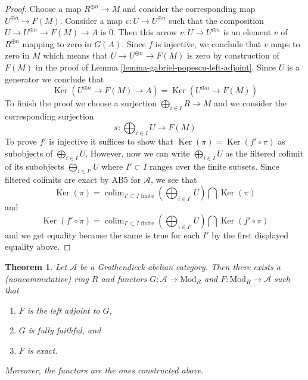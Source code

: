 \documentclass{stacks-project}
\theoremstyle{plain}
\newtheorem{theorem}[subsection]{Theorem}
\theoremstyle{definition}
\theoremstyle{remark}
\numberwithin{equation}{subsection}
\def\colim{\mathop{\mathrm{colim}}\nolimits}
\def\Ker{\mathop{\mathrm{Ker}}}
\begin{document}
\begin{proof}
Choose a map $R^{\oplus n} \to M$ and consider the corresponding map
$U^{\oplus n} \to F(M)$. Consider a map $v : U \to U^{\oplus n}$
such that the composition $U \to U^{\oplus n} \to F(M) \to A$ is $0$.
Then this arrow $v : U \to U^{\oplus n}$ is an element
$v$ of $R^{\oplus n}$ mapping to zero in $G(A)$. Since $f$ is injective,
we conclude that $v$ maps to zero in $M$ which means that
$U \to U^{\oplus n} \to F(M)$ is zero by construction of $F(M)$
in the proof of Lemma \ref{lemma-gabriel-popescu-left-adjoint}.
Since $U$ is a generator we conclude that
$$
\Ker(U^{\oplus n} \to F(M) \to A) = \Ker(U^{\oplus n} \to F(M))
$$
To finish the proof we choose a surjection $\bigoplus_{i \in I} R \to M$
and we consider the corresponding surjection
$$
\pi : \bigoplus\nolimits_{i \in I} U \longrightarrow F(M)
$$
To prove $f'$ is injective it suffices to show that
$\Ker(\pi) = \Ker(f' \circ \pi)$ as subobjects of $\bigoplus_{i \in I} U$.
However, now we can write $\bigoplus_{i \in I} U$ as the filtered colimit
of its subobjects $\bigoplus_{i \in I'} U$ where $I' \subset I$
ranges over the finite subsets. Since filtered colimits are
exact by AB5 for $\mathcal{A}$, we see that
$$
\Ker(\pi) =
\colim_{I' \subset I\text{ finite}}
\left(\bigoplus\nolimits_{i \in I'} U\right)
\bigcap \Ker(\pi)
$$
and
$$
\Ker(f' \circ \pi) =
\colim_{I' \subset I\text{ finite}}
\left(\bigoplus\nolimits_{i \in I'} U\right)
\bigcap \Ker(f' \circ \pi)
$$
and we get equality because the same is true for each $I'$ by
the first displayed equality above.
\end{proof}

\begin{theorem}
\label{theorem-gabriel-popescu}
Let $\mathcal{A}$ be a Grothendieck abelian category. Then there exists
a (noncommutative) ring $R$ and functors $G : \mathcal{A} \to \text{Mod}_R$
and $F : \text{Mod}_R \to \mathcal{A}$ such that
\begin{enumerate}
\item $F$ is the left adjoint to $G$,
\item $G$ is fully faithful, and
\item $F$ is exact.
\end{enumerate}
Moreover, the functors are the ones constructed above.
\end{theorem}
\end{document}
